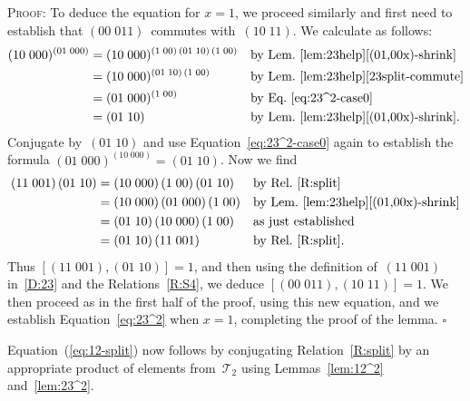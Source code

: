 \documentclass[a4paper,11pt]{article}
\numberwithin{equation}{section}
\newcommand{\eqstate}[1]{Equation~(\ref{#1})}
\newcommand{\swap}[2]{(#1\;#2)}
\newcommand{\Sw}[1]{\mathcal{T}_{#1}}
\newcommand{\qed}{\hspace*{\fill}$\square$}
\newenvironment{proof}{%
  \begin{trivlist}\item\textsc{Proof:}}{\qed\end{trivlist}}
\begin{document}
\begin{proof}
  To deduce the equation for $x = 1$, we proceed similarly and first
  need to establish that $\swap{00}{011}$~commutes
  with~$\swap{10}{11}$.  We calculate as follows:
  \begin{align*}
    \swap{10}{000}^{\swap{01}{000}}
    &= \swap{10}{000}^{\swap{1}{00} \, \swap{01}{10} \, \swap{1}{00}}
    &&\text{by Lem.~\ref{lem:23help}\ref{(01,00x)-shrink}} \\
    &= \swap{10}{000}^{\swap{01}{10} \, \swap{1}{00}}
    &&\text{by Lem.~\ref{lem:23help}\ref{23split-commute}} \\
    &= \swap{01}{000}^{\swap{1}{00}}
    &&\text{by Eq.~\eqref{eq:23^2-case0}} \\
    &= \swap{01}{10}
    &&\text{by Lem.~\ref{lem:23help}\ref{(01,00x)-shrink}}.
  \end{align*}
  Conjugate by~$\swap{01}{10}$ and use Equation~\eqref{eq:23^2-case0}
  again to establish the formula $\swap{01}{000}^{\swap{10}{000}} =
  \swap{01}{10}$.  Now we find
  \begin{align*}
    \swap{11}{001} \, \swap{01}{10} &=
    \swap{10}{000} \, \swap{1}{00} \, \swap{01}{10}
    &&\text{by Rel.~\ref{R:split}} \\
    &= \swap{10}{000} \, \swap{01}{000} \, \swap{1}{00}
    &&\text{by Lem.~\ref{lem:23help}\ref{(01,00x)-shrink}} \\
    &= \swap{01}{10} \, \swap{10}{000} \, \swap{1}{00}
    &&\text{as just established} \\
    &= \swap{01}{10} \, \swap{11}{001}
    &&\text{by Rel.~\ref{R:split}.}
  \end{align*}
  Thus $[ \swap{11}{001} , \swap{01}{10} ] = 1$, and then using the
  definition of~$\swap{11}{001}$ in~\eqref{D:23} and the
  Relations~\ref{R:S4}, we deduce $[ \swap{00}{011} , \swap{10}{11} ]
  = 1$.  We then proceed as in the first half of the proof, using this
  new equation, and we establish Equation~\eqref{eq:23^2} when $x =
  1$, completing the proof of the lemma.
\end{proof}

\eqstate{eq:12-split} now follows by conjugating
Relation~\ref{R:split} by an appropriate product of elements
from~$\Sw{2}$ using Lemmas~\ref{lem:12^2} and~\ref{lem:23^2}.
\end{document}
